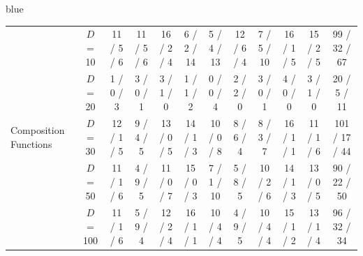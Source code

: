 \documentclass[journal, onecolumn]{IEEEtran}
\begin{document}
\begin{color}{blue}
\begin{table}[h]
{\begin{tabular}{l|c|ccc|cccccc|c}
			\multirow{5}{*}{Composition Functions}	
			& 	$D$ = 10 	& 11 / 5 / 6
			& 11 / 5 / 6
			& 16 / 2 / 4
			& 6 / 2 / 14
			& 5 / 4 / 13
			& 12 / 6 / 4
			& 7 / 5 / 10
			& 16 / 1 / 5
			& 15 / 2 / 5
			& 99 / 32 / 67 \\
			& $D$ = 20 & 1 / 0 / 3
			& 3 / 0 / 1
			& 3 / 1 / 0
			& 1 / 1 / 2
			& 0 / 0 / 4
			& 2 / 2 / 0
			& 3 / 0 / 1
			& 4 / 0 / 0
			& 3 / 1 / 0
			& 20 / 5 / 11 \\
			& $D$ = 30 & 12 / 1 / 5
			& 9 / 4 / 5
			& 13 / 0 / 5
			& 14 / 1 / 3
			& 10 / 0 / 8
			& 8 / 6 / 4
			& 8 / 3 / 7
			& 16 / 1 / 1
			& 11 / 1 / 6
			& 101 / 17 / 44 \\
			& $D$ = 50 & 11 / 1 / 6
			& 4 / 9 / 5
			& 11 / 0 / 7
			& 15 / 0 / 3
			& 7 / 1 / 10
			& 5 / 8 / 5
			& 10 / 2 / 6
			& 14 / 1 / 3
			& 13 / 0 / 5
			& 90 / 22 / 50 \\
			& $D$ = 100 & 11 / 1 / 6
			& 5 / 9 / 4
			& 12 / 2 / 4
			& 16 / 1 / 1
			& 10 / 4 / 4
			& 4 / 9 / 5
			& 10 / 4 / 4
			& 15 / 1 / 2
			& 13 / 1 / 4
			& 96 / 32 / 34 \\
			\hline																						\end{tabular}
		\vspace{-2mm}
		}
\end{table}

\begin{table}[h]
	\centering
	\caption{\textcolor{blue}{Comparison scores of DLES use different network on cec 2018 benchmark.}}
	\vspace{-2mm}
	\label{d-network}
	\color{blue}
\end{table}
\end{color}
\end{document}
